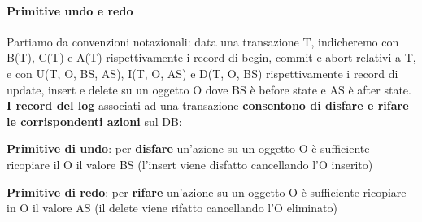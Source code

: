 \documentclass[10pt]{book}
\begin{document}
\paragraph{Primitive undo e redo} Partiamo da convenzioni notazionali: data una transazione T, indicheremo con B(T), C(T) e A(T) rispettivamente i record di begin, commit e abort relativi a T, e con U(T, O, BS, AS), I(T, O, AS) e D(T, O, BS) rispettivamente i record di update, insert e delete su un oggetto O dove BS è before state e AS è after state.\\
\textbf{I record del log} associati ad una transazione \textbf{consentono di disfare e rifare le corrispondenti azioni} sul DB:
\begin{list}{}{}
	\item \textbf{Primitive di undo}: per \textbf{disfare} un'azione su un oggetto O è sufficiente ricopiare il O il valore BS (l'insert viene disfatto cancellando l'O inserito)
	\item \textbf{Primitive di redo}: per \textbf{rifare} un'azione su un oggetto O è sufficiente ricopiare in O il valore AS (il delete viene rifatto cancellando l'O eliminato)
\end{list}
\end{document}
